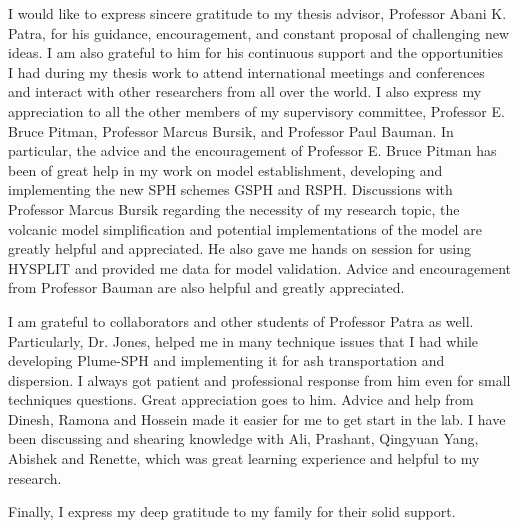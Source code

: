 I would like to express sincere gratitude to my thesis advisor, Professor Abani K. Patra, for his
guidance, encouragement, and constant proposal of challenging new ideas. I am also grateful
to him for his continuous support and the opportunities I had during my thesis work to attend international meetings and conferences and interact with other researchers from all over the world.
I also express my appreciation to all the other members of my supervisory committee, Professor E. Bruce Pitman, Professor Marcus Bursik, and Professor Paul Bauman. In particular, the advice
and the encouragement of Professor E. Bruce Pitman has been of great help in my work on model establishment, developing and implementing the new SPH schemes GSPH and RSPH. Discussions with Professor Marcus Bursik regarding the necessity of my research topic, the volcanic model simplification and potential implementations of the model are greatly helpful and appreciated. He also gave me hands on session for using HYSPLIT and provided me data for model validation. Advice and encouragement from Professor Bauman are also helpful and greatly appreciated.

I am grateful to collaborators and other students of Professor Patra as well. Particularly, Dr. Jones, helped me in many technique issues that I had while developing Plume-SPH and implementing it for ash transportation and dispersion. I always got patient and professional response from him even for small techniques questions. Great appreciation goes to him. Advice and help from Dinesh, Ramona and Hossein made it easier for me to get start in the lab. I have been discussing and shearing knowledge with Ali, Prashant, Qingyuan Yang, Abishek and Renette, which was great learning experience and helpful to my research. 
 
Finally, I express my deep gratitude to my family for their solid support.